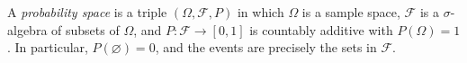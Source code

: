 
A \emph{probability space} is a triple $(\Omega,\mathcal F,P)$ in which $\Omega$ is a sample space, $\mathcal F$ is a $\sigma$-algebra of subsets of $\Omega$, and $P:\mathcal F\to[0,1]$ is countably additive with $P(\Omega)=1$. In particular, $P(\varnothing)=0$, and the events are precisely the sets in $\mathcal F$.
